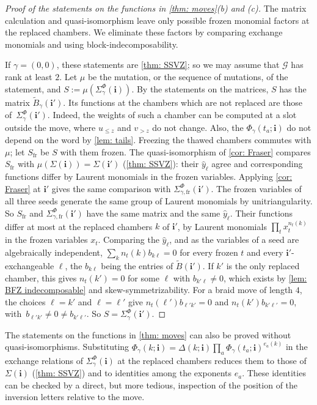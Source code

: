 \documentclass[a4paper]{amsart}
\numberwithin{equation}{section}
\theoremstyle{definition}
\theoremstyle{remark}
\newcommand{\mcG}{\mathcal{G}}
\newcommand{\bfi}{\mathbf{i}}
\newcommand{\tB}{\widetilde{B}}
\begin{document}
\begin{proof}[Proof of the statements on the functions in \cref{thm: moves}(b) and (c)]
  The matrix calculation and quasi-isomorphism leave only possible frozen monomial factors at the replaced chambers.
  We eliminate these factors by comparing exchange monomials and using block-indecomposability.

  If $\gamma=(0,0)$, these statements are \cref{thm: SSVZ}; so we may assume that $\mcG$ has rank at least $2$.
  Let $\mu$ be the mutation, or the sequence of mutations, of the statement, and $S:=\mu(\Sigma^\Phi_\gamma(\bfi))$.
  By the statements on the matrices, $S$ has the matrix $\tB_\gamma(\bfi')$.
  Its functions at the chambers which are not replaced are those of~$\Sigma^\Phi_\gamma(\bfi')$.
  Indeed, the weights of such a chamber can be computed at a slot outside the move, where $u_{\le z}$ and $v_{>z}$ do not change.
  Also, the $\Phi_\gamma(t_a;\bfi)$ do not depend on the word by \cref{lem: tails}.
  Freezing the thawed chambers commutes with $\mu$; let $S_\mathrm{fr}$ be $S$ with them frozen.
  The quasi-isomorphism of \cref{cor: Fraser} compares $S_\mathrm{fr}$ with $\mu(\Sigma(\bfi))=\Sigma(\bfi')$ (\cref{thm: SSVZ}): their $\hat y_\ell$ agree and corresponding functions differ by Laurent monomials in the frozen variables.
  Applying \cref{cor: Fraser} at $\bfi'$ gives the same comparison with $\Sigma^\Phi_{\gamma,\mathrm{fr}}(\bfi')$.
  The frozen variables of all three seeds generate the same group of Laurent monomials by unitriangularity.
  So $S_\mathrm{fr}$ and $\Sigma^\Phi_{\gamma,\mathrm{fr}}(\bfi')$ have the same matrix and the same $\hat y_\ell$.
  Their functions differ at most at the replaced chambers $k$ of $\bfi'$, by Laurent monomials $\prod_tx_t^{n_t(k)}$ in the frozen variables $x_t$.
  Comparing the $\hat y_\ell$, and as the variables of a seed are algebraically independent, $\sum_k n_t(k)b_{k\ell}=0$ for every frozen $t$ and every $\bfi'$-exchangeable $\ell$, the $b_{k\ell}$ being the entries of $\tB(\bfi')$.
  If $k'$ is the only replaced chamber, this gives $n_t(k')=0$ for some $\ell$ with $b_{k'\ell}\neq0$, which exists by \cref{lem: BFZ indecomposable} and skew-symmetrizability.
  For a braid move of length $4$, the choices $\ell=k'$ and $\ell=\ell'$ give $n_t(\ell')b_{\ell'k'}=0$ and $n_t(k')b_{k'\ell'}=0$, with~$b_{\ell'k'}\neq0\neq b_{k'\ell'}$.
  So $S=\Sigma^\Phi_\gamma(\bfi')$.
\end{proof}

\begin{remark}
  The statements on the functions in \cref{thm: moves} can also be proved without quasi-isomorphisms.
  Substituting $\Phi_\gamma(k;\bfi)=\Delta(k;\bfi)\prod_a\Phi_\gamma(t_a;\bfi)^{e_a(k)}$ in the exchange relations of $\Sigma^\Phi_\gamma(\bfi)$ at the replaced chambers reduces them to those of $\Sigma(\bfi)$ (\cref{thm: SSVZ}) and to identities among the exponents $e_a$.
  These identities can be checked by a direct, but more tedious, inspection of the position of the inversion letters relative to the move.
\end{remark}
\end{document}
